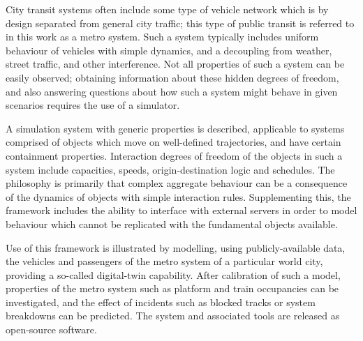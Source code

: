

City transit systems often include some type of vehicle network which
is by design separated from general city traffic; this type of public
transit is referred to in this work as a metro system. Such a system
typically includes uniform behaviour of vehicles with simple dynamics,
and a decoupling from weather, street traffic, and other interference.
Not all properties of such a system can be easily observed; obtaining
information about these hidden degrees of freedom, and also answering
questions about how such a system might behave in given scenarios
requires the use of a simulator.

A simulation system with generic properties is described, applicable
to systems comprised of objects which move on well-defined
trajectories, and have certain containment properties. Interaction
degrees of freedom of the objects in such a system include capacities,
speeds, origin-destination logic and schedules.  The philosophy is
primarily that complex aggregate behaviour can be a consequence of the
dynamics of objects with simple interaction rules.  Supplementing
this, the framework includes the ability to interface with external
servers in order to model behaviour which cannot be replicated with the
fundamental objects available.

Use of this framework is illustrated by modelling, using
publicly-available data, the vehicles and passengers of the metro
system of a particular world city, providing a so-called digital-twin
capability. After calibration of such a model, properties of the metro
system such as platform and train occupancies can be investigated, and
the effect of incidents such as blocked tracks or system breakdowns
can be predicted.
%
The system and associated tools are released as open-source software.
